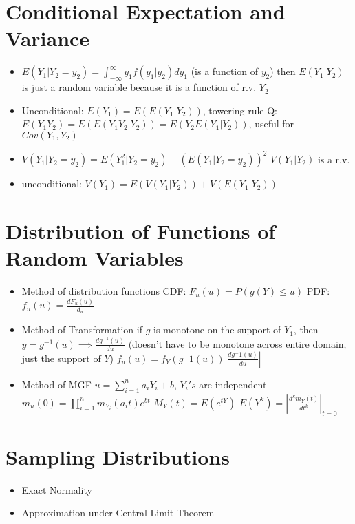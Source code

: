 \documentclass{report}
\begin{document}
\section{Conditional Expectation and Variance}
\begin{itemize}
	\item $E(Y_1|Y_2 = y_2) = \int_{-\infty}^{\infty}y_1f(y_1|y_2)dy_1$ (is a function of $y_2$)
	\subitem then $E(Y_1|Y_2)$ is just a random variable because it is a function of r.v. $Y_2$
	\item Unconditional: $E(Y_1) = E(E(Y_1|Y_2))$, towering rule
	\subitem Q:$E(Y_1Y_2) = E(E(Y_1Y_2|Y_2)) = E(Y_2E(Y_1|Y_2))$, useful for $Cov(Y_1,Y_2)$
	\item $V(Y_1|Y_2 = y_2) = E(Y_1^2|Y_2 = y_2) - (E(Y_1|Y_2 = y_2))^2$
	\subitem $V(Y_1|Y_2)$ is a r.v.
	\item unconditional: $V(Y_1) = E(V(Y_1|Y_2)) + V(E(Y_1|Y_2))$
\end{itemize}
\section{Distribution of Functions of Random Variables}
\begin{itemize}
	\item Method of distribution functions 
	\subitem CDF: $F_u(u) = P(g(Y) \leq u)$
	\subitem PDF: $f_u(u) = \frac{dF_u(u)}{d_u}$
	\item Method of Transformation
	\subitem if $g$ is monotone on the support of $Y_1$, then $y = g^{-1}(u) \implies \frac{dg^{-1}(u)}{du}$ (doesn't have to be monotone across entire domain, just the support of $Y$)
	\subitem $f_u(u) = f_Y(g^-1(u))|\frac{dg^-1(u)}{du}|$
	\item Method of MGF
	\subitem $u = \sum_{i=1}^{n}a_iY_i + b$, $Y_i's$ are independent
	\subitem $m_u(0) = \prod_{i=1}^{n}m_{Y_{i}}(a_{i}t)e^{bt}$
	\subitem $M_Y(t) =E(e^{tY})$
	\subitem $E(Y^k) = |\frac{d^km_Y(t)}{dt^k}|_{t=0}$
\end{itemize}
\section{Sampling Distributions}
\begin{itemize}
	\item Exact Normality
	\item Approximation under Central Limit Theorem
\end{itemize}

\end{document}
